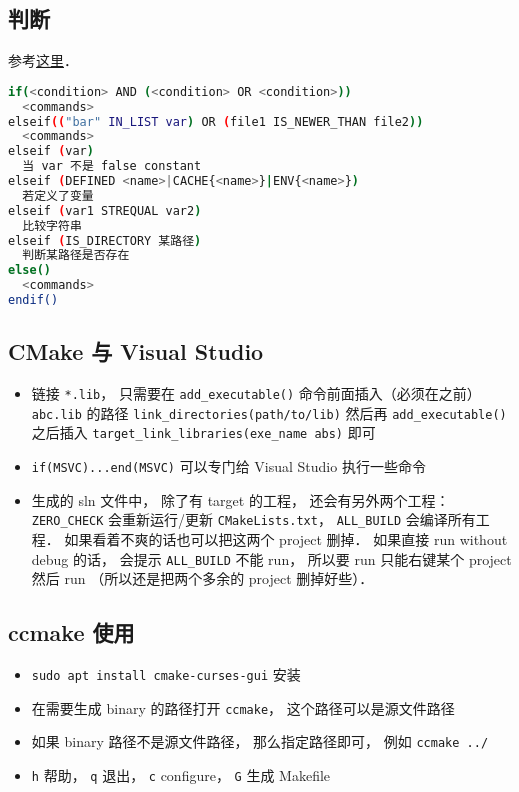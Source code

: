 \subsection{判断}
参考\href{https://cmake.org/cmake/help/latest/command/if.html}{这里}．
\begin{lstlisting}[language=bash]
if(<condition> AND (<condition> OR <condition>))
  <commands>
elseif(("bar" IN_LIST var) OR (file1 IS_NEWER_THAN file2))
  <commands>
elseif (var)
  当 var 不是 false constant
elseif (DEFINED <name>|CACHE{<name>}|ENV{<name>})
  若定义了变量
elseif (var1 STREQUAL var2)
  比较字符串
elseif (IS_DIRECTORY 某路径)
  判断某路径是否存在
else()
  <commands>
endif()
\end{lstlisting}

\subsection{CMake 与 Visual Studio}
\begin{itemize}
\item 链接 \verb`*.lib`， 只需要在 \verb`add_executable()` 命令前面插入（必须在之前） \verb`abc.lib` 的路径 \verb`link_directories(path/to/lib)` 然后再 \verb`add_executable()` 之后插入 \verb`target_link_libraries(exe_name abs)` 即可
\item \verb`if(MSVC)...end(MSVC)` 可以专门给 Visual Studio 执行一些命令
\item 生成的 sln 文件中， 除了有 target 的工程， 还会有另外两个工程： \verb`ZERO_CHECK` 会重新运行/更新 \verb`CMakeLists.txt`， \verb`ALL_BUILD` 会编译所有工程． 如果看着不爽的话也可以把这两个 project 删掉． 如果直接 run without debug 的话， 会提示 \verb`ALL_BUILD` 不能 run， 所以要 run 只能右键某个 project 然后 run （所以还是把两个多余的 project 删掉好些）．
\end{itemize}

\subsection{ccmake 使用}
\begin{itemize}
\item \verb`sudo apt install cmake-curses-gui` 安装
\item 在需要生成 binary 的路径打开 \verb`ccmake`， 这个路径可以是源文件路径
\item 如果 binary 路径不是源文件路径， 那么指定路径即可， 例如 \verb`ccmake ../`
\item \verb`h` 帮助， \verb`q` 退出， \verb`c` configure， \verb`G` 生成 Makefile
\end{itemize}
